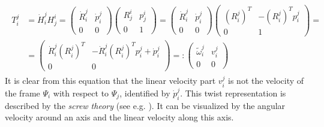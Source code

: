 \documentclass[a4paper,twoside, openright,12pt]{report}
\begin{document}
\begin{eqnarray}\label{EQ:twistdecomposition}
\begin{aligned}
T_i^j &= \dot{H}_i^j H_j^i =
\begin{pmatrix}
\dot{R}_i^j & \dot{p}_i^j \\ 0 & 0
\end{pmatrix}
\begin{pmatrix}
R_j^i & p_j^i \\ 0 & 1
\end{pmatrix} = 
\begin{pmatrix}
\dot{R}_i^j & \dot{p}_i^j \\ 0 & 0
\end{pmatrix}
\begin{pmatrix}
(R_i^j)^T & -(R_i^j)^Tp_i^j \\ 0 & 1
\end{pmatrix} = \\ &= 
\begin{pmatrix}
\dot{R}_i^j(R_i^j)^T & -\dot{R}_i^j(R_i^j)^Tp_i^j + \dot{p}_i^j \\ 0 & 0
\end{pmatrix} =: 
\begin{pmatrix}
\tilde{\omega}_i^j & v_i^j \\ 0 & 0
\end{pmatrix}
\end{aligned}
\end{eqnarray}
It is clear from this equation that the linear velocity part $v_i^j$ is not the velocity of the frame $\Psi_i$ with respect to $\Psi_j$, identified by $\dot{p}_i^j$. This twist representation is described by the \emph{screw theory} (see e.g. \cite{KinematicsHandbook}). It can be visualized by the angular velocity around an axis and the linear velocity along this axis.
\end{document}
